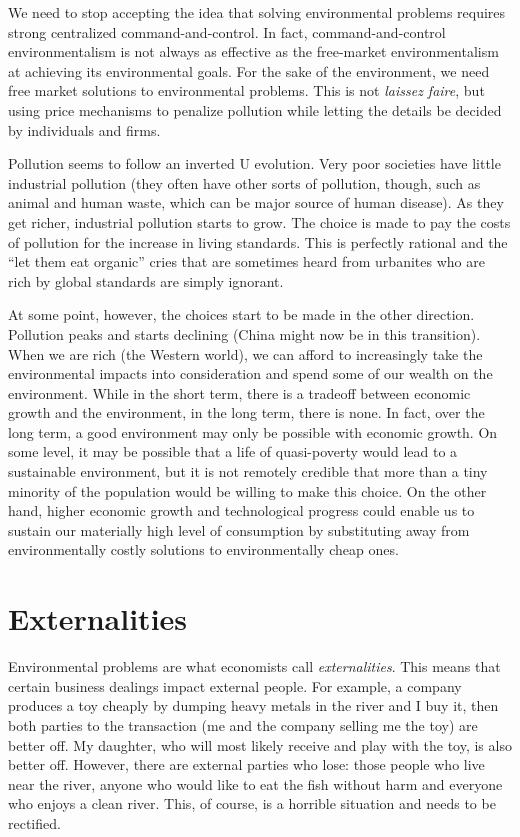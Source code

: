 We need to stop accepting the idea that solving environmental problems requires
strong centralized command-and-control. In fact, command-and-control
environmentalism is not always as effective as the free-market environmentalism
at achieving its environmental goals. For the sake of the environment, we need
free market solutions to environmental problems. This is not \emph{laissez
faire}, but using price mechanisms to penalize pollution while letting the
details be decided by individuals and firms.

Pollution seems to follow an inverted U evolution. Very poor societies have
little industrial pollution (they often have other sorts of pollution, though,
such as animal and human waste, which can be major source of human disease). As
they get richer, industrial pollution starts to grow. The choice is made to pay
the costs of pollution for the increase in living standards. This is perfectly
rational and the ``let them eat organic'' cries that are sometimes heard from
urbanites who are rich by global standards are simply ignorant.

At some point, however, the choices start to be made in the other direction.
Pollution peaks and starts declining (China might now be in this transition).
When we are rich (the Western world), we can afford to increasingly take the
environmental impacts into consideration and spend some of our wealth on the
environment.  While in the short term, there is a tradeoff between economic
growth and the environment, in the long term, there is none. In fact, over the
long term, a good environment may only be possible with economic growth. On
some level, it may be possible that a life of quasi-poverty would lead to a
sustainable environment, but it is not remotely credible that more than a tiny
minority of the population would be willing to make this choice. On the other
hand, higher economic growth and technological progress could enable us to
sustain our materially high level of consumption by substituting away from
environmentally costly solutions to environmentally cheap ones.

\section{Externalities}

Environmental problems are what economists call \emph{externalities}. This
means that certain business dealings impact external people. For example, a
company produces a toy cheaply by dumping heavy metals in the river and I buy
it, then both parties to the transaction (me and the company selling me the
toy) are better off. My daughter, who will most likely receive and play with
the toy, is also better off. However, there are external parties who lose:
those people who live near the river, anyone who would like to eat the fish
without harm and everyone who enjoys a clean river. This, of course, is a
horrible situation and needs to be rectified.

